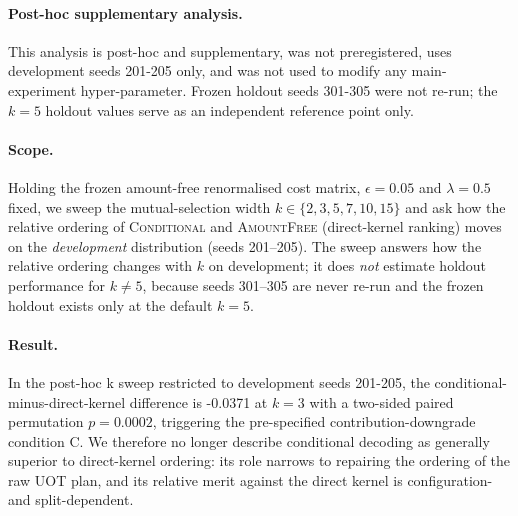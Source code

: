 \paragraph{Post-hoc supplementary analysis.}
This analysis is post-hoc and supplementary, was not preregistered, uses development seeds 201-205 only, and was not used to modify any main-experiment hyper-parameter. Frozen holdout seeds 301-305 were not re-run; the $k=5$ holdout values serve as an independent reference point only.

\paragraph{Scope.}
Holding the frozen amount-free renormalised cost matrix, $\epsilon = 0.05$ and
$\lambda = 0.5$ fixed, we sweep the mutual-selection width
$k \in \{2, 3, 5, 7, 10, 15\}$ and ask how the relative ordering of
\textsc{Conditional} and \textsc{AmountFree} (direct-kernel ranking) moves on the
\emph{development} distribution (seeds 201--205). The sweep answers how the relative
ordering changes with $k$ on development; it does \emph{not} estimate holdout performance
for $k \neq 5$, because seeds 301--305 are never re-run and the frozen holdout exists only
at the default $k=5$.

\paragraph{Result.}
In the post-hoc k sweep restricted to development seeds 201-205, the conditional-minus-direct-kernel difference is -0.0371 at $k=3$ with a two-sided paired permutation $p = 0.0002$, triggering the pre-specified contribution-downgrade condition C. We therefore no longer describe conditional decoding as generally superior to direct-kernel ordering: its role narrows to repairing the ordering of the raw UOT plan, and its relative merit against the direct kernel is configuration- and split-dependent.

